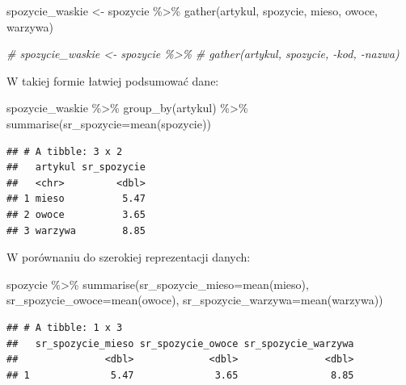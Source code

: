 \documentclass[
]{book}
\newenvironment{Shaded}{\begin{snugshade}}{\end{snugshade}}
\newcommand{\AttributeTok}[1]{\textcolor[rgb]{0.77,0.63,0.00}{#1}}
\newcommand{\CommentTok}[1]{\textcolor[rgb]{0.56,0.35,0.01}{\textit{#1}}}
\newcommand{\FunctionTok}[1]{\textcolor[rgb]{0.00,0.00,0.00}{#1}}
\newcommand{\NormalTok}[1]{#1}
\newcommand{\OtherTok}[1]{\textcolor[rgb]{0.56,0.35,0.01}{#1}}
\newcommand{\SpecialCharTok}[1]{\textcolor[rgb]{0.00,0.00,0.00}{#1}}
\begin{document}
\begin{Shaded}
\begin{Highlighting}[]
\NormalTok{spozycie\_waskie }\OtherTok{\textless{}{-}}\NormalTok{ spozycie }\SpecialCharTok{\%\textgreater{}\%}
  \FunctionTok{gather}\NormalTok{(artykul, spozycie, mieso, owoce, warzywa)}

\CommentTok{\# spozycie\_waskie \textless{}{-} spozycie \%\textgreater{}\%}
\CommentTok{\#   gather(artykul, spozycie, {-}kod, {-}nazwa)}
\end{Highlighting}
\end{Shaded}

W takiej formie łatwiej podsumować dane:

\begin{Shaded}
\begin{Highlighting}[]
\NormalTok{spozycie\_waskie }\SpecialCharTok{\%\textgreater{}\%}
  \FunctionTok{group\_by}\NormalTok{(artykul) }\SpecialCharTok{\%\textgreater{}\%}
  \FunctionTok{summarise}\NormalTok{(}\AttributeTok{sr\_spozycie=}\FunctionTok{mean}\NormalTok{(spozycie))}
\end{Highlighting}
\end{Shaded}

\begin{verbatim}
## # A tibble: 3 x 2
##   artykul sr_spozycie
##   <chr>         <dbl>
## 1 mieso          5.47
## 2 owoce          3.65
## 3 warzywa        8.85
\end{verbatim}

W porównaniu do szerokiej reprezentacji danych:

\begin{Shaded}
\begin{Highlighting}[]
\NormalTok{spozycie }\SpecialCharTok{\%\textgreater{}\%}
  \FunctionTok{summarise}\NormalTok{(}\AttributeTok{sr\_spozycie\_mieso=}\FunctionTok{mean}\NormalTok{(mieso),}
            \AttributeTok{sr\_spozycie\_owoce=}\FunctionTok{mean}\NormalTok{(owoce),}
            \AttributeTok{sr\_spozycie\_warzywa=}\FunctionTok{mean}\NormalTok{(warzywa))}
\end{Highlighting}
\end{Shaded}

\begin{verbatim}
## # A tibble: 1 x 3
##   sr_spozycie_mieso sr_spozycie_owoce sr_spozycie_warzywa
##               <dbl>             <dbl>               <dbl>
## 1              5.47              3.65                8.85
\end{verbatim}
\end{document}
